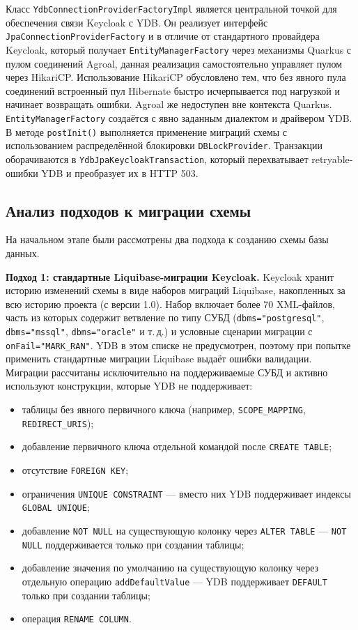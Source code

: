 \documentclass[times]{itmo-student-thesis}
\begin{document}
Класс \texttt{YdbConnectionProviderFactoryImpl} является центральной точкой для
обеспечения связи Keycloak с YDB. Он реализует интерфейс 
\texttt{JpaConnectionProviderFactory} и в отличие от стандартного
провайдера Keycloak, который получает \texttt{EntityManagerFactory} через
механизмы Quarkus с пулом соединений Agroal, данная реализация самостоятельно
управляет пулом через HikariCP. Использование HikariCP обусловлено тем, 
что без явного пула соединений встроенный пул Hibernate быстро 
исчерпывается под нагрузкой и начинает возвращать ошибки. Agroal же 
недоступен вне контекста Quarkus. \texttt{EntityManagerFactory} создаётся с явно заданным
диалектом и драйвером YDB. В методе \texttt{postInit()} выполняется применение миграций схемы
с использованием распределённой блокировки \texttt{DBLockProvider}.
Транзакции оборачиваются в \texttt{YdbJpaKeycloakTransaction}, который
перехватывает retryable-ошибки YDB и преобразует их в HTTP 503.

\subsection{Анализ подходов к миграции схемы}

На начальном этапе были рассмотрены два подхода к созданию схемы базы данных.

\textbf{Подход 1: стандартные Liquibase-миграции Keycloak.}
Keycloak хранит историю изменений схемы в виде наборов миграций Liquibase, накопленных
за всю историю проекта (с версии 1.0). Набор включает более 70 XML-файлов, часть из
которых содержит ветвление по типу СУБД (\texttt{dbms="postgresql"}, \texttt{dbms="mssql"},
\texttt{dbms="oracle"} и т.\,д.) и условные сценарии миграции с \texttt{onFail="MARK\_RAN"}.
YDB в этом списке не предусмотрен, поэтому при попытке применить стандартные миграции
Liquibase выдаёт ошибки валидации. Миграции рассчитаны исключительно на поддерживаемые
СУБД и активно используют конструкции, которые YDB не поддерживает:
\begin{itemize}
    \item таблицы без явного первичного ключа (например, \texttt{SCOPE\_MAPPING}, \texttt{REDIRECT\_URIS});
    \item добавление первичного ключа отдельной командой после \texttt{CREATE TABLE};
    \item отсутствие \texttt{FOREIGN KEY};
    \item ограничения \texttt{UNIQUE CONSTRAINT} --- вместо них YDB поддерживает индексы \texttt{GLOBAL UNIQUE};
    \item добавление \texttt{NOT NULL} на существующую колонку через \texttt{ALTER TABLE} --- \texttt{NOT NULL} поддерживается только при создании таблицы;
    \item добавление значения по умолчанию на существующую колонку через отдельную операцию \texttt{addDefaultValue} --- YDB поддерживает \texttt{DEFAULT} только при создании таблицы;
    \item операция \texttt{RENAME COLUMN}.
\end{itemize}
\end{document}
